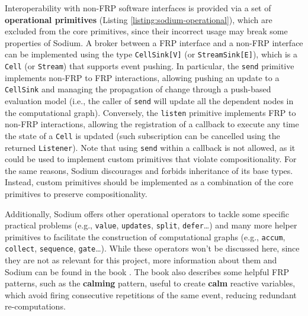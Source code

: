 Interoperability with non-\ac{FRP} software interfaces is provided via a set of
\textbf{operational primitives} (Listing \ref{listing:sodium-operational}),
which are excluded from the core primitives, since their incorrect usage may
break some properties of Sodium. A broker between a \ac{FRP} interface and a
non-\ac{FRP} interface can be implemented using the type \texttt{CellSink[V]}
(or \texttt{StreamSink[E]}), which is a \texttt{Cell} (or \texttt{Stream}) that
supports event pushing. In particular, the \texttt{send} primitive implements
non-FRP to FRP interactions, allowing pushing an update to a \texttt{CellSink}
and managing the propagation of change through a push-based evaluation model
(i.e., the caller of \texttt{send} will update all the dependent nodes in the
computational graph). Conversely, the \texttt{listen} primitive implements FRP
to non-FRP interactions, allowing the registration of a callback to execute any
time the state of a \texttt{Cell} is updated (such subscription can be
cancelled using the returned \texttt{Listener}). Note that using \texttt{send}
within a callback is not allowed, as it could be used to implement custom
primitives that violate compositionality. For the same reasons, Sodium
discourages and forbids inheritance of its base types. Instead, custom
primitives should be implemented as a combination of the core primitives to
preserve compositionality.



Additionally, Sodium offers other operational operators to tackle some specific
practical problems (e.g., \texttt{value}, \texttt{updates}, \texttt{split},
\texttt{defer}\dots) and many more helper primitives to facilitate the
construction of computational graphs (e.g., \texttt{accum}, \texttt{collect},
\texttt{sequence}, \texttt{gate}\dots). While these operators won't be
discussed here, since they are not as relevant for this project, more
information about them and Sodium can be found in the book \cite{FRP}. The book
also describes some helpful \ac{FRP} patterns, such as the \textbf{calming}
pattern, useful to create \textbf{calm} reactive variables, which avoid firing
consecutive repetitions of the same event, reducing redundant re-computations.

